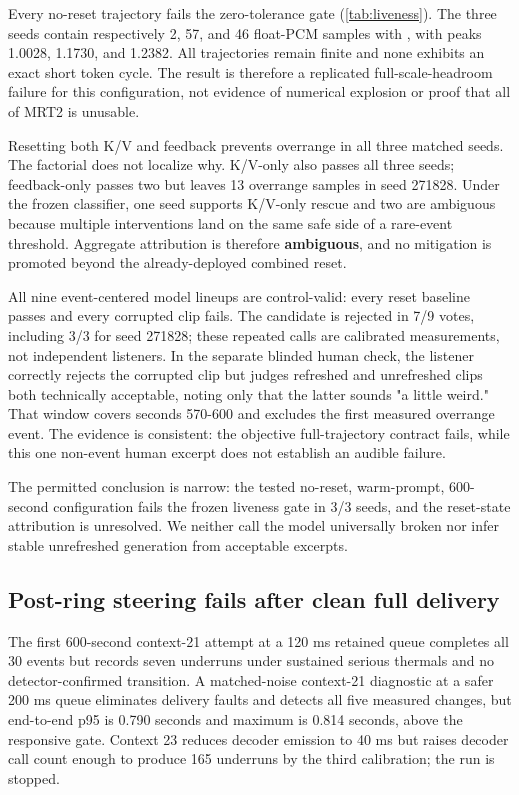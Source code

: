\documentclass[10pt]{article}
\begin{document}
Every no-reset trajectory fails the zero-tolerance gate (\cref{tab:liveness}). The three seeds contain respectively 2, 57, and 46 float-PCM samples with \texttt{}, with peaks 1.0028, 1.1730, and 1.2382. All trajectories remain finite and none exhibits an exact short token cycle. The result is therefore a replicated full-scale-headroom failure for this configuration, not evidence of numerical explosion or proof that all of MRT2 is unusable.

Resetting both K/V and feedback prevents overrange in all three matched seeds. The factorial does not localize why. K/V-only also passes all three seeds; feedback-only passes two but leaves 13 overrange samples in seed 271828. Under the frozen classifier, one seed supports K/V-only rescue and two are ambiguous because multiple interventions land on the same safe side of a rare-event threshold. Aggregate attribution is therefore \textbf{ambiguous}, and no mitigation is promoted beyond the already-deployed combined reset.

All nine event-centered model lineups are control-valid: every reset baseline passes and every corrupted clip fails. The candidate is rejected in 7/9 votes, including 3/3 for seed 271828; these repeated calls are calibrated measurements, not independent listeners. In the separate blinded human check, the listener correctly rejects the corrupted clip but judges refreshed and unrefreshed clips both technically acceptable, noting only that the latter sounds "a little weird." That window covers seconds 570-600 and excludes the first measured overrange event. The evidence is consistent: the objective full-trajectory contract fails, while this one non-event human excerpt does not establish an audible failure.

The permitted conclusion is narrow: the tested no-reset, warm-prompt, 600-second configuration fails the frozen liveness gate in 3/3 seeds, and the reset-state attribution is unresolved. We neither call the model universally broken nor infer stable unrefreshed generation from acceptable excerpts.

\subsection{Post-ring steering fails after clean full delivery}
The first 600-second context-21 attempt at a 120 ms retained queue completes all 30 events but records seven underruns under sustained serious thermals and no detector-confirmed transition. A matched-noise context-21 diagnostic at a safer 200 ms queue eliminates delivery faults and detects all five measured changes, but end-to-end p95 is 0.790 seconds and maximum is 0.814 seconds, above the responsive gate. Context 23 reduces decoder emission to 40 ms but raises decoder call count enough to produce 165 underruns by the third calibration; the run is stopped.
\end{document}
